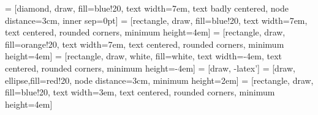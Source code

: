  = [diamond, draw, fill=blue!20, 
       text width=7em, text badly centered, node distance=3cm, inner sep=0pt]
 = [rectangle, draw, fill=blue!20, 
       text width=7em, text centered, rounded corners, minimum height=4em]
 = [rectangle, draw, fill=orange!20, 
       text width=7em, text centered, rounded corners, minimum height=4em]
 = [rectangle, draw, white, fill=white, 
       text width=-4em, text centered, rounded corners, minimum height=-4em]
 = [draw, -latex']
 = [draw, ellipse,fill=red!20, node distance=3cm,
       minimum height=2em]
 = [rectangle, draw, fill=blue!20, 
       text width=3em, text centered, rounded corners, minimum height=4em]

